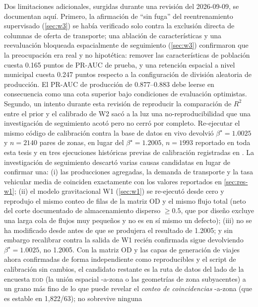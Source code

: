 Dos limitaciones adicionales, surgidas durante una revisión del 2026-09-09, se
documentan aquí. Primero, la afirmación de ``sin fuga'' del reentrenamiento supervisado
(\cref{sec:w3}) se había verificado solo contra la exclusión directa de columnas de
oferta de transporte; una ablación de características y una reevaluación bloqueada
espacialmente de seguimiento (\cref{sec:w3}) confirmaron que la preocupación era real y
no hipotética: remover las características de población cuesta \num{0.165} puntos de
PR-AUC de prueba, y una retención espacial a nivel municipal cuesta \num{0.247} puntos
respecto a la configuración de división aleatoria de producción. El PR-AUC de
producción de \num{0.877}--\num{0.883} debe leerse en consecuencia como una cota
superior bajo condiciones de evaluación optimistas. Segundo, un intento durante esta
revisión de reproducir la comparación de $R^2$ entre el prior y el calibrado de W2 sacó
a la luz una no-reproducibilidad que una investigación de seguimiento acotó pero no
cerró por completo. Re-ejecutar el mismo código de calibración contra la base de datos
en vivo devolvió $\beta^\star = \num{1.0025}$ y $n=2140$ pares de zonas, en lugar del
$\beta^\star = \num{1.2005}$, $n=\num{1993}$ reportado en toda esta tesis y en tres
ejecuciones históricas previas de calibración registradas en
. La investigación de seguimiento descartó varias causas
candidatas en lugar de confirmar una: (i) las producciones agregadas, la demanda de
transporte y la tasa vehicular media de  coinciden
exactamente con los valores reportados en \cref{sec:res-w1}; (ii) el modelo
gravitacional W1 (\cref{sec:w1}) se re-ejecutó desde cero y reprodujo el mismo conteo de
filas de la matriz OD y el mismo flujo total (neto del corte documentado de
almacenamiento disperso $\ge\num{0.5}$, que por diseño excluye una larga cola de flujos
muy pequeños y no es en sí mismo un defecto); (iii) 
no se ha modificado desde antes de que se produjera el resultado de \num{1.2005}; y sin
embargo recalibrar contra la salida de W1 recién confirmada sigue devolviendo
$\beta^\star=\num{1.0025}$, no \num{1.2005}. Con la matriz OD y las capas de generación
de viajes ahora confirmadas de forma independiente como reproducibles y el script de
calibración sin cambios, el candidato restante es la ruta de datos del lado de la
encuesta \textsc{eod} (la unión espacial \ageb-a-zona o las geometrías de zona
subyacentes) a un grano más fino de lo que puede revelar el \emph{conteo de
coincidencias} \ageb-a-zona (que es estable en 1,822/63); no sobrevive ninguna

